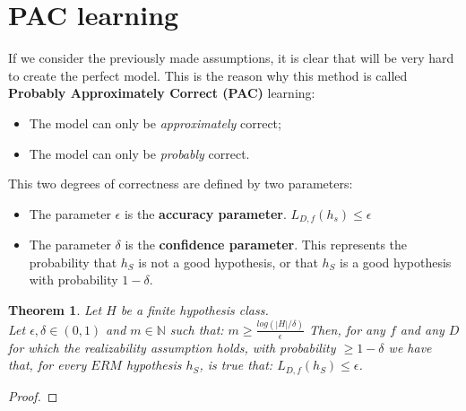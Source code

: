 \documentclass[12pt, a4paper, english]{report}
\newtheorem{theorem}{Theorem}
\begin{document}
\section{PAC learning}
If we consider the previously made assumptions, it is clear that will be very hard to create the perfect model.\newline
This is the reason why this method is called \textbf{Probably Approximately Correct (PAC)} learning:
\begin{itemize}
    \item The model can only be \emph{approximately} correct;
    \item The model can only be \emph{probably} correct.
\end{itemize}
This two degrees of correctness are defined by two parameters:
\begin{itemize}
    \item The parameter $\epsilon$ is the \textbf{accuracy parameter}. $L_{D,f}(h_{s}) \leq \epsilon$
    \item The parameter $\delta$ is the \textbf{confidence parameter}. This represents the probability that $h_{S}$ is not a good hypothesis, or that $h_{S}$ is a good hypothesis with probability
    $1 - \delta$.
\end{itemize}
\begin{theorem}
    Let $H$ be a finite hypothesis class.\\
    Let $\epsilon, \delta \in (0,1)$ and $m \in \mathbb{N}$ such that:\newline
    $m \geq \frac{log(|H| / \delta)}{\epsilon}$\newline
    Then, for any $f$ and any $D$ for which the realizability assumption holds, with probability
    $\geq 1 - \delta$ we have that, for every $ERM$ hypothesis $h_{S}$, is true that: \newline
    $L_{D,f}(h_{S}) \leq \epsilon$.
\end{theorem}
\begin{proof}
\end{proof}

\printbibliography
\end{document}
